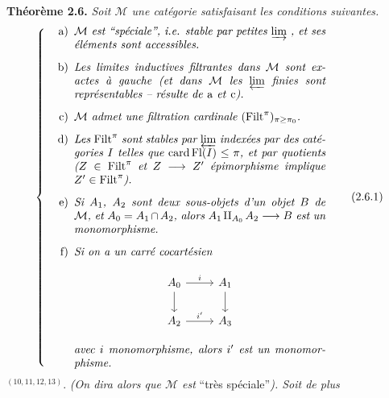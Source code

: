 \documentclass[11pt]{article}
\newcommand{\msp}[1]{\marginpar{\footnotesize [#1]}}
\newcommand{\Fl}{\mathrm{Fl}}
\newcommand{\Filt}{\mathrm{Filt}}
\begin{document}
\msp{page 25}
\textbf{Théorème 2.6.} \textit{Soit $\mathcal{M}$ une catégorie satisfaisant les conditions suivantes.}
\[ \left\{ \begin{minipage}{0.72\textwidth}\itshape
\begin{itemize}[leftmargin=2.5em]
\item[\upshape a)] $\mathcal{M}$ est “spéciale”, i.e. stable par petites $\varinjlim$ , et ses éléments sont accessibles.
\item[\upshape b)] Les limites inductives filtrantes dans $\mathcal{M}$ sont exactes à gauche (et dans $\mathcal{M}$ les $\varprojlim$ finies sont représentables – résulte de \textup{a} et \textup{c}).
\item[\upshape c)] $\mathcal{M}$ admet une filtration cardinale $(\Filt^\pi)_{\pi\geq\pi_0}$.
\item[\upshape d)] Les $\Filt^\pi$ sont stables par $\varprojlim$ indexées par des catégories $I$ telles que $\operatorname{card}\Fl(I) \leq \pi$, et par quotients ($Z \in \Filt^\pi$ et $Z \longrightarrow Z'$ épimorphisme implique $Z' \in \Filt^\pi$).
\item[\upshape e)] Si $A_1$, $A_2$ sont deux sous-objets d'un objet $B$ de $\mathcal{M}$, et $A_0 = A_1 \cap A_2$, alors $A_1 \amalg_{A_0} A_2 \longrightarrow B$ est un monomorphisme.
\item[\upshape f)] Si on a un carré cocartésien
\begin{center}
\begin{tikzcd}
A_0 \arrow[r, "i"] \arrow[d] & A_1 \arrow[d] \\
A_2 \arrow[r, "i'"] & A_3
\end{tikzcd}
\end{center}
avec $i$ monomorphisme, alors $i'$ est un monomorphisme.
\end{itemize}
\end{minipage}\right. \tag*{(2.6.1)} \]
$^{(10,11,12,13)}$. \textit{(On dira alors que $\mathcal{M}$ est} “très spéciale”\textit{). Soit de plus}
\end{document}
